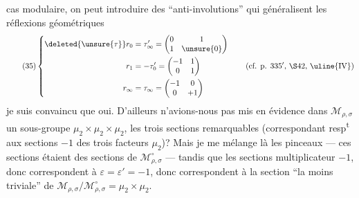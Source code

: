 cas modulaire, on peut introduire des ``anti-involutions'' qui généralisent les réflexions géométriques
\[
\tag{35}
\left\{
\begin{aligned}
\deleted{\unsure{\tau}}r_0&=\tau'_\infty=\begin{pmatrix}0&1\\1&\unsure{0}\end{pmatrix}\\
r_1&=-\tau'_0=\begin{pmatrix}-1&1\\0&1\end{pmatrix}\\
r_\infty&=\tau_\infty=\begin{pmatrix}-1&0\\0&+1\end{pmatrix}
\end{aligned}
\right.
\qquad\text{(cf. p. $335'$, $\S42$, $\uline{\mathrm{IV}}$)}
\]
je suis convaincu que oui. D'ailleurs n'avions-nous pas mis en évidence dans $\mathcal M_{\rho,\sigma}$ un sous-groupe $\mu_2\times\mu_2\times\mu_2$,   les trois sections remarquables (correspondant resp\textsuperscript{t} aux  sections $-1$ des trois facteurs $\mu_2$)? Mais je me mélange là les pinceaux --- ces sections étaient des sections de $\mathcal M_{\rho,\sigma}^{\circ}$ --- tandis que les sections    multiplicateur
$-1$, donc correspondent à $\varepsilon=\varepsilon'=-1$, donc correspondent à la section ``la moins triviale''  de $\mathcal M_{\rho,\sigma}/\mathcal M_{\rho,\sigma}^{\circ}=\mu_2\times\mu_2$.

